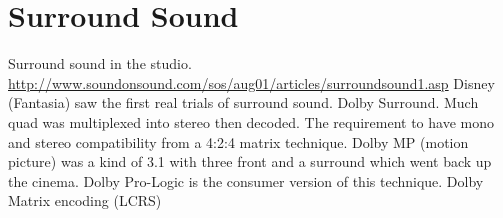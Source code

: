 \section{Surround Sound}


Surround sound in the studio.
\url{http://www.soundonsound.com/sos/aug01/articles/surroundsound1.asp}
Disney (Fantasia) saw the first real trials of surround sound.
Dolby Surround. Much quad was multiplexed into stereo then decoded. 
The requirement to have mono and stereo compatibility from a 4:2:4 matrix technique. 
Dolby MP (motion picture) was a kind of 3.1 with three front and a surround which went 
back up the cinema. Dolby Pro-Logic is the consumer version of this technique. 
Dolby Matrix encoding (LCRS)


\begin{comment}

\begin{figure}[H]
\centering
\texttt{[image: usssinputoutput]}\caption{ussstools input output and sfplay}
\label{fig:usssinputoutput}
\end{figure}

\end{comment}

